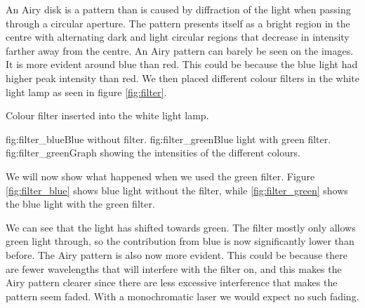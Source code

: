 An Airy disk is a pattern than is caused by diffraction of the light when passing through a circular aperture. The pattern presents itself as a bright region in the centre with alternating dark and light circular regions that decrease in intensity farther away from the centre. An Airy pattern can barely be seen on the images. It is more evident around blue than red. This could be because the blue light had higher peak intensity than red. We then placed different colour filters in the white light lamp as seen in figure \vref{fig:filter}.

    {Colour filter inserted into the white light lamp.}

    {fig:filter_blue}{Blue without filter.}
    {fig:filter_green}{Blue light with green filter.}
    {fig:filter_green}{Graph showing the intensities of the different colours.}


We will now show what happened when we used the green filter. Figure \vref{fig:filter_blue} shows blue light without the filter, while \vref{fig:filter_green} shows the blue light with the green filter.

We can see that the light has shifted towards green. The filter mostly only allows green light through, so the contribution from blue is now significantly lower than before. The Airy pattern is also now more evident. This could be because there are fewer wavelengths that will interfere with the filter on, and this makes the Airy pattern clearer since there are less excessive interference that makes the pattern seem faded. With a monochromatic laser we would expect no such fading.
